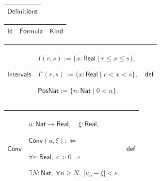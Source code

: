 \documentclass[11pt]{amsart}
\renewcommand{\arraystretch}{1.4}
\newlength{\FTCOneColumnBody}
\newlength{\FTCThreeColumnBody}
\begin{document}
{\centering
\renewcommand{\arraystretch}{1.4}
\par\setlength{\parskip}{0pt}\nointerlineskip
\noindent
\begin{tabular}{|@{}>{\centering\arraybackslash}m{\FTCOneColumnBody}|}\hline
$\displaystyle \textsf{Definitions}$\\ \hline
\end{tabular}%
\par\setlength{\parskip}{0pt}\nointerlineskip
\noindent
\begin{tabular}{|@{}>{\centering\arraybackslash}m{0.251968\FTCThreeColumnBody}|>{\centering\arraybackslash}m{0.590551\FTCThreeColumnBody}|>{\centering\arraybackslash}m{0.157480\FTCThreeColumnBody}|}\hline
$\displaystyle \textsf{Id}$ & $\displaystyle \textsf{Formula}$ & $\displaystyle \textsf{Kind}$\\ \hline
\end{tabular}%
\par\setlength{\parskip}{0pt}\nointerlineskip
\noindent
\begin{tabular}{|@{}>{\centering\arraybackslash}m{0.251968\FTCThreeColumnBody}|>{\centering\arraybackslash}m{0.590551\FTCThreeColumnBody}|>{\centering\arraybackslash}m{0.157480\FTCThreeColumnBody}|}\hline
\hypertarget{def:Intervals}{$\displaystyle \textsf{Intervals}$} & $\displaystyle I(r,s):=\{x:\textsf{Real}\mid r\le x\le s\},$\par
$\displaystyle I^\circ(r,s):=\{x:\textsf{Real}\mid r<x<s\},$\par
$\displaystyle \textsf{PosNat}:=\{n:\textsf{Nat}\mid0<n\}.$ & $\displaystyle \textsf{def}$\\ \hline
\end{tabular}%
\par\setlength{\parskip}{0pt}\nointerlineskip
\noindent
\begin{tabular}{|@{}>{\centering\arraybackslash}m{0.251968\FTCThreeColumnBody}|>{\centering\arraybackslash}m{0.590551\FTCThreeColumnBody}|>{\centering\arraybackslash}m{0.157480\FTCThreeColumnBody}|}\hline
\hypertarget{def:Conv}{$\displaystyle \textsf{Conv}$} & $\displaystyle u:\textsf{Nat}\to\textsf{Real},\quad\xi:\textsf{Real},$\par
$\displaystyle \textsf{Conv}(u,\xi):\Longleftrightarrow$\par
$\displaystyle \forall\varepsilon:\textsf{Real},\ \varepsilon>0\Rightarrow$\par
$\displaystyle \exists N:\textsf{Nat},\ \forall n\ge N,\ |u_n-\xi|<\varepsilon.$ & $\displaystyle \textsf{def}$\\ \hline

\end{tabular}}
\end{document}
